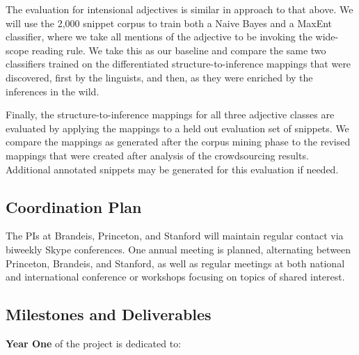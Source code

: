 \documentclass[10pt]{article}
\begin{document}
The evaluation for intensional adjectives is similar in approach to that above. We will use the 2,000 snippet corpus  to train both a Naive Bayes and a MaxEnt classifier, where we take all mentions of the adjective to be invoking the   wide-scope reading rule. We take this as our baseline and compare the same two classifiers trained on the differentiated structure-to-inference mappings that were discovered, first by the linguists, and then, as they were enriched by the inferences in the wild. 


Finally, the structure-to-inference mappings for all three adjective classes are evaluated by applying the mappings to a held out evaluation set of snippets. We compare the mappings as generated after the corpus mining phase to the revised mappings that were created after analysis of the crowdsourcing results. Additional annotated snippets may be generated for this evaluation if needed. 

\vspace {-2mm}
\vspace {-2mm}
\subsection{Coordination Plan}
\vspace {-2mm}

The PIs at Brandeis, Princeton, and Stanford will maintain regular contact
via biweekly Skype conferences. One annual meeting is planned, alternating between Princeton, Brandeis, and Stanford, as well as regular  meetings at both national and international conference or workshops focusing 
on topics of shared interest. 

\vspace {-2mm}
\vspace {-2mm}

\subsection{Milestones and Deliverables}
\vspace {-1mm}

 
{\bf Year One} of the project is dedicated to: 
\end{document}
